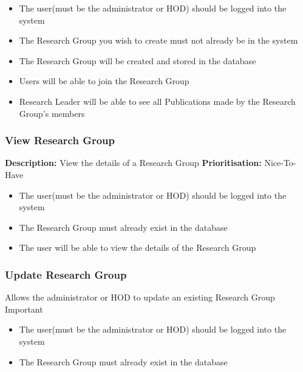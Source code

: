 \documentclass[a4paper]{article}
\begin{document}
	 \begin{itemize}
		\item The user(must be the administrator or HOD) should be logged into the system
		\item The Research Group you wish to create must not already be in the system
	\end{itemize}
	
	 \begin{itemize}
		\item The Research Group will be created and stored in the database
		\item Users will be able to join the Research Group
		\item Research Leader will be able to see all Publications made by the Research Group's members
	\end{itemize}
	
	\subsubsection{View Research Group}
	\textbf{Description:} View the details of a Research Group
	\textbf{Prioritisation:} Nice-To-Have
	
	 \begin{itemize}
		\item The user(must be the administrator or HOD) should be logged into the system
		\item The Research Group must already exist in the database
    \end{itemize}
	
	 \begin{itemize}
		\item The user will be able to view the details of the Research Group
	\end{itemize}
	
	\subsubsection{Update Research Group}
	 Allows the administrator or HOD to update an existing Research Group\\
	 Important\\
	
	 \begin{itemize}
		\item The user(must be the administrator or HOD) should be logged into the system
		\item The Research Group must already exist in the database
	\end{itemize}
	
\end{document}
